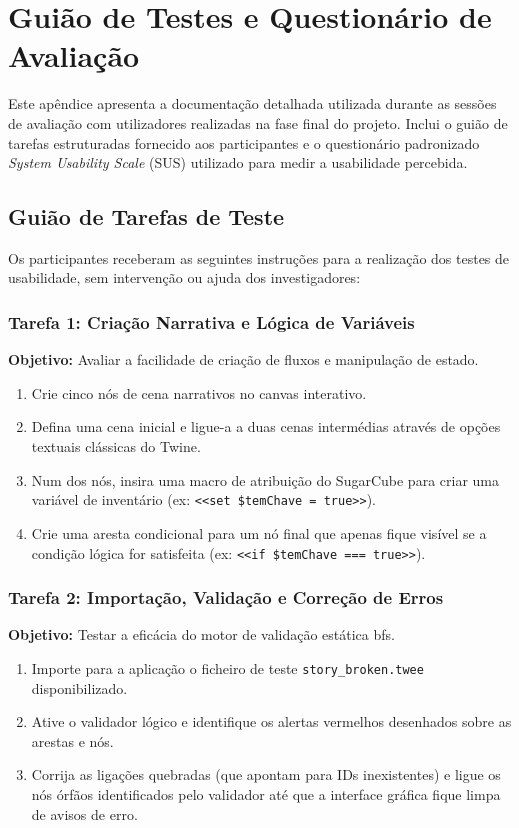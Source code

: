 \chapter{Guião de Testes e Questionário de Avaliação}
\label{ap:guiao-questionarios}

Este apêndice apresenta a documentação detalhada utilizada durante as sessões de avaliação com utilizadores realizadas na fase final do projeto. Inclui o guião de tarefas estruturadas fornecido aos participantes e o questionário padronizado \textit{System Usability Scale} (SUS) utilizado para medir a usabilidade percebida.

\section{Guião de Tarefas de Teste}
Os participantes receberam as seguintes instruções para a realização dos testes de usabilidade, sem intervenção ou ajuda dos investigadores:

\subsection*{Tarefa 1: Criação Narrativa e Lógica de Variáveis}
\textbf{Objetivo:} Avaliar a facilidade de criação de fluxos e manipulação de estado.
\begin{enumerate}
    \item Crie cinco nós de cena narrativos no canvas interativo.
    \item Defina uma cena inicial e ligue-a a duas cenas intermédias através de opções textuais clássicas do Twine.
    \item Num dos nós, insira uma macro de atribuição do SugarCube para criar uma variável de inventário (ex: \texttt{<<set \$temChave = true>>}).
    \item Crie uma aresta condicional para um nó final que apenas fique visível se a condição lógica for satisfeita (ex: \texttt{<<if \$temChave === true>>}).
\end{enumerate}

\subsection*{Tarefa 2: Importação, Validação e Correção de Erros}
\textbf{Objetivo:} Testar a eficácia do motor de validação estática \gls{bfs}.
\begin{enumerate}
    \item Importe para a aplicação o ficheiro de teste \texttt{story\_broken.twee} disponibilizado.
    \item Ative o validador lógico e identifique os alertas vermelhos desenhados sobre as arestas e nós.
    \item Corrija as ligações quebradas (que apontam para IDs inexistentes) e ligue os nós órfãos identificados pelo validador até que a interface gráfica fique limpa de avisos de erro.
\end{enumerate}

